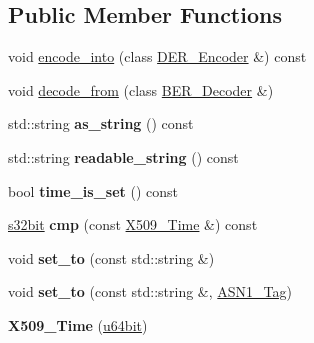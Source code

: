 \subsection*{Public Member Functions}
\begin{DoxyCompactItemize}
\item 
void \hyperlink{classBotan_1_1X509__Time_a58ba60813cdb2185f3f4436f902ee77f}{encode\-\_\-into} (class \hyperlink{classBotan_1_1DER__Encoder}{D\-E\-R\-\_\-\-Encoder} \&) const 
\item 
void \hyperlink{classBotan_1_1X509__Time_ad95080960c8960d478aebde194b5a11d}{decode\-\_\-from} (class \hyperlink{classBotan_1_1BER__Decoder}{B\-E\-R\-\_\-\-Decoder} \&)
\item 
\hypertarget{classBotan_1_1X509__Time_a4f487a3aa648e056825e06ad7c2c01e6}{std\-::string {\bfseries as\-\_\-string} () const }\label{classBotan_1_1X509__Time_a4f487a3aa648e056825e06ad7c2c01e6}

\item 
\hypertarget{classBotan_1_1X509__Time_a757f433f0bfce20db4c011a8940c1d87}{std\-::string {\bfseries readable\-\_\-string} () const }\label{classBotan_1_1X509__Time_a757f433f0bfce20db4c011a8940c1d87}

\item 
\hypertarget{classBotan_1_1X509__Time_ae968865b4a8068c6f67f287206534749}{bool {\bfseries time\-\_\-is\-\_\-set} () const }\label{classBotan_1_1X509__Time_ae968865b4a8068c6f67f287206534749}

\item 
\hypertarget{classBotan_1_1X509__Time_a782646fbc4453476aba4b6f4000e83ba}{\hyperlink{namespaceBotan_a28e03d327abd4d5b1e7091e8d80d5cfe}{s32bit} {\bfseries cmp} (const \hyperlink{classBotan_1_1X509__Time}{X509\-\_\-\-Time} \&) const }\label{classBotan_1_1X509__Time_a782646fbc4453476aba4b6f4000e83ba}

\item 
\hypertarget{classBotan_1_1X509__Time_a8397eb9674683c274e648ddc30df752f}{void {\bfseries set\-\_\-to} (const std\-::string \&)}\label{classBotan_1_1X509__Time_a8397eb9674683c274e648ddc30df752f}

\item 
\hypertarget{classBotan_1_1X509__Time_aab199e2b2cfe7eb3fbde523c321149d3}{void {\bfseries set\-\_\-to} (const std\-::string \&, \hyperlink{namespaceBotan_aaa08f67a945ef195fa39e62659dffa7a}{A\-S\-N1\-\_\-\-Tag})}\label{classBotan_1_1X509__Time_aab199e2b2cfe7eb3fbde523c321149d3}

\item 
\hypertarget{classBotan_1_1X509__Time_ad53f20c9dd2afa3e71f560ed6af21026}{{\bfseries X509\-\_\-\-Time} (\hyperlink{namespaceBotan_a634063d9fb05e25262ca94ed927030f6}{u64bit})}\label{classBotan_1_1X509__Time_ad53f20c9dd2afa3e71f560ed6af21026}


\end{DoxyCompactItemize}
